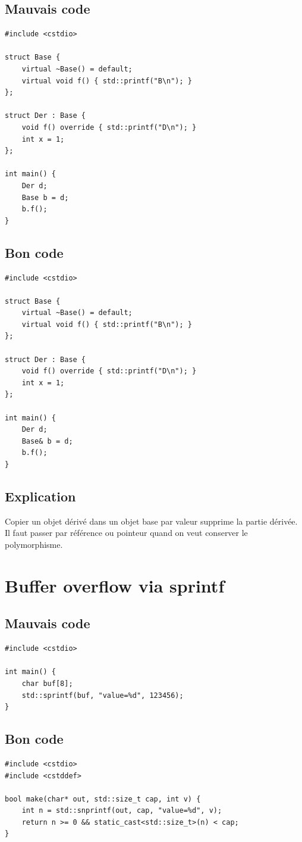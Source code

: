 \documentclass[a4paper,11pt]{report}
\begin{document}
\section{Mauvais code}
\begin{lstlisting}
#include <cstdio>

struct Base {
    virtual ~Base() = default;
    virtual void f() { std::printf("B\n"); }
};

struct Der : Base {
    void f() override { std::printf("D\n"); }
    int x = 1;
};

int main() {
    Der d;
    Base b = d;
    b.f();
}
\end{lstlisting}

\section{Bon code}
\begin{lstlisting}
#include <cstdio>

struct Base {
    virtual ~Base() = default;
    virtual void f() { std::printf("B\n"); }
};

struct Der : Base {
    void f() override { std::printf("D\n"); }
    int x = 1;
};

int main() {
    Der d;
    Base& b = d;
    b.f();
}
\end{lstlisting}

\section{Explication}
Copier un objet dérivé dans un objet base par valeur supprime la partie dérivée.
Il faut passer par référence ou pointeur quand on veut conserver le polymorphisme.

\chapter{Buffer overflow via sprintf}

\section{Mauvais code}
\begin{lstlisting}
#include <cstdio>

int main() {
    char buf[8];
    std::sprintf(buf, "value=%d", 123456);
}
\end{lstlisting}

\section{Bon code}
\begin{lstlisting}
#include <cstdio>
#include <cstddef>

bool make(char* out, std::size_t cap, int v) {
    int n = std::snprintf(out, cap, "value=%d", v);
    return n >= 0 && static_cast<std::size_t>(n) < cap;
}
\end{lstlisting}
\end{document}
